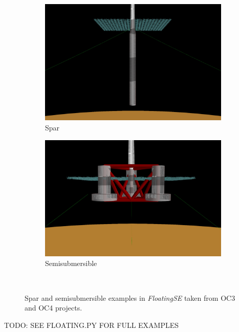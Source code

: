 \begin{figure}[htb]
  \begin{subfigure}[b]{0.49\linewidth}
    \centering \includegraphics[width=\linewidth]{figs/spar-initial.pdf}
    \caption{Spar}
  \end{subfigure}
  \begin{subfigure}[b]{0.49\linewidth}
    \centering \includegraphics[width=\linewidth]{figs/semi-initial.pdf}
    \caption{Semisubmersible}
  \end{subfigure}\\
  \caption{Spar and semisubmersible examples in \textit{FloatingSE} taken from
    OC3\citep{OC3} and OC4\citep{OC4} projects.}
  \label{fig:initial}
\end{figure}

TODO: SEE FLOATING.PY FOR FULL EXAMPLES
